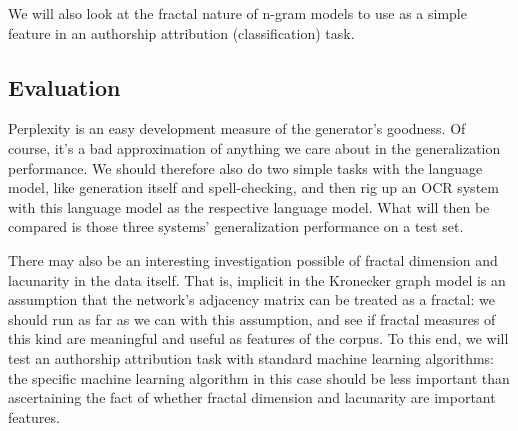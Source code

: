 \documentclass[12pt]{article}
\begin{document}
We will also look at the fractal nature of n-gram models to use as a simple feature in an authorship attribution (classification) task.
\subsection{Evaluation}
Perplexity is an easy development measure of the generator's goodness. Of course, it's a bad approximation of anything we care about in the generalization performance. We should therefore also do two simple tasks with the language model, like generation itself and spell-checking, and then rig up an OCR system with this language model as the respective language model. What will then be compared is those three systems' generalization performance on a test set.

There may also be an interesting investigation possible of fractal dimension and lacunarity in the data itself. That is, implicit in the Kronecker graph model is an assumption that the network's adjacency matrix can be treated as a fractal: we should run as far as we can with this assumption, and see if fractal measures of this kind are meaningful and useful as features of the corpus. To this end, we will test an authorship attribution task with standard machine learning algorithms: the specific machine learning algorithm in this case should be less important than ascertaining the fact of whether fractal dimension and lacunarity are important features.

\end{document}
